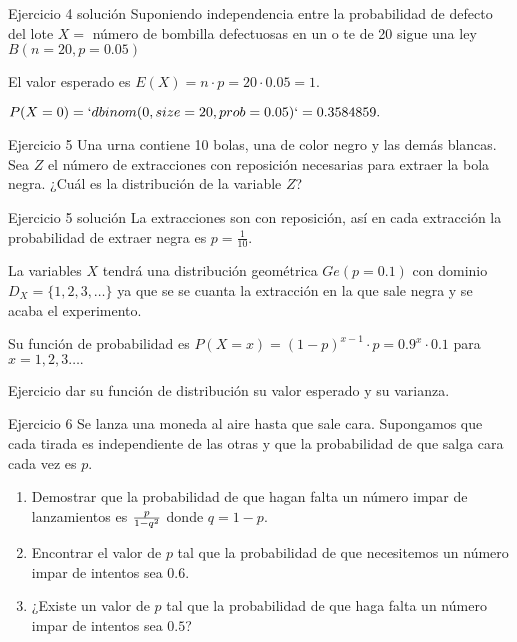 \documentclass[
  ignorenonframetext,
]{beamer}
\providecommand{\tightlist}{%
  \setlength{\itemsep}{0pt}\setlength{\parskip}{0pt}}
\begin{document}
\begin{frame}{Ejercicio 4 solución}
\protect\hypertarget{ejercicio-4-soluciuxf3n}{}
Suponiendo independencia entre la probabilidad de defecto del lote
\(X=\) número de bombilla defectuosas en un o te de 20 sigue una ley
\(B(n=20,p=0.05)\)

El valor esperado es \(E(X)=n\cdot p= 20\cdot 0.05=1.\)

\(P(X=0)=`dbinom(0,size=20,prob=0.05)`=0.3584859.\)
\end{frame}

\begin{frame}{Ejercicio 5}
\protect\hypertarget{ejercicio-5}{}
Una urna contiene 10 bolas, una de color negro y las demás blancas. Sea
\(Z\) el número de extracciones con reposición necesarias para extraer
la bola negra. ¿Cuál es la distribución de la variable \(Z\)?
\end{frame}

\begin{frame}{Ejercicio 5 solución}
\protect\hypertarget{ejercicio-5-soluciuxf3n}{}
La extracciones son con reposición, así en cada extracción la
probabilidad de extraer negra es \(p=\frac{1}{10}\).

La variables \(X\) tendrá una distribución geométrica \(Ge(p=0.1)\) con
dominio \(D_X=\{1,2,3,\ldots\}\) ya que se se cuanta la extracción en la
que sale negra y se acaba el experimento.

Su función de probabilidad es
\(P(X=x)=(1-p)^{x-1}\cdot p=0.9^x \cdot 0.1\) para \(x=1,2,3\ldots.\)

Ejercicio dar su función de distribución su valor esperado y su
varianza.
\end{frame}

\begin{frame}{Ejercicio 6}
\protect\hypertarget{ejercicio-6}{}
Se lanza una moneda al aire hasta que sale cara. Supongamos que cada
tirada es independiente de las otras y que la probabilidad de que salga
cara cada vez es \(p\).

\begin{enumerate}
\tightlist
\item
  Demostrar que la probabilidad de que hagan falta un número impar de
  lanzamientos es \({p\over 1-q^2}\) donde \(q=1-p\).
\item
  Encontrar el valor de \(p\) tal que la probabilidad de que necesitemos
  un número impar de intentos sea \(0.6\).
\item
  ¿Existe un valor de \(p\) tal que la probabilidad de que haga falta un
  número impar de intentos sea \(0.5\)?
\end{enumerate}
\end{frame}
\end{document}
